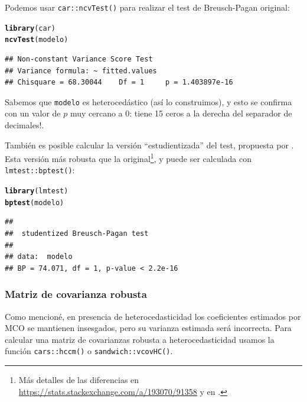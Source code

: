 \documentclass{article}\usepackage[]{graphicx}\usepackage[]{color}
\makeatletter
\newcommand{\hlstd}[1]{\textcolor[rgb]{0.345,0.345,0.345}{#1}}%
\newcommand{\hlkwd}[1]{\textcolor[rgb]{0.737,0.353,0.396}{\textbf{#1}}}%
\newenvironment{kframe}{%
 \def\at@end@of@kframe{}%
 \ifinner\ifhmode%
  \def\at@end@of@kframe{\end{minipage}}%
  \begin{minipage}{\columnwidth}%
 \fi\fi%
 \def\FrameCommand##1{\hskip\@totalleftmargin \hskip-\fboxsep
 \colorbox{shadecolor}{##1}\hskip-\fboxsep
     \hskip-\linewidth \hskip-\@totalleftmargin \hskip\columnwidth}%
 \MakeFramed {\advance\hsize-\width
   \@totalleftmargin\z@ \linewidth\hsize
   \@setminipage}}%
 {\par\unskip\endMakeFramed%
 \at@end@of@kframe}
\newenvironment{knitrout}{}{} %
\makeatother
\begin{document}
Podemos usar \verb|car::ncvTest()| para realizar el test de Breusch-Pagan original:

\begin{knitrout}
\color{fgcolor}\begin{kframe}
\begin{alltt}
\hlkwd{library}\hlstd{(car)}
\hlkwd{ncvTest}\hlstd{(modelo)}
\end{alltt}
\begin{verbatim}
## Non-constant Variance Score Test 
## Variance formula: ~ fitted.values 
## Chisquare = 68.30044    Df = 1     p = 1.403897e-16
\end{verbatim}
\end{kframe}
\end{knitrout}

Sabemos que \verb|modelo| es heterocedástico (así lo construimos), y esto se confirma con un valor de $p$ muy cercano a 0: tiene 15 ceros a la derecha del separador de decimales!.

También es posible calcular la versión ``estudientizada'' del test, propuesta por \textcite{koenker_note_1981}. Esta versión más robusta que la original\footnote{Más detalles de las diferencias en \url{https://stats.stackexchange.com/a/193070/91358} y en \textcite{koenker_note_1981}.}, y puede ser calculada con \verb|lmtest::bptest()|:

\begin{knitrout}
\color{fgcolor}\begin{kframe}
\begin{alltt}
\hlkwd{library}\hlstd{(lmtest)}
\hlkwd{bptest}\hlstd{(modelo)}
\end{alltt}
\begin{verbatim}
## 
## 	studentized Breusch-Pagan test
## 
## data:  modelo
## BP = 74.071, df = 1, p-value < 2.2e-16
\end{verbatim}
\end{kframe}
\end{knitrout}


\subsubsection{Matriz de covarianza robusta}
\label{sec:matriz_cov_robusta}

Como mencioné, en presencia de heterocedasticidad los coeficientes estimados por MCO se mantienen insesgados, pero su varianza estimada será incorrecta. Para calcular una matriz de covarianzas robusta a heterocedasticidad usamos la función \verb|cars::hccm()| o \verb|sandwich::vcovHC()|.
\end{document}
